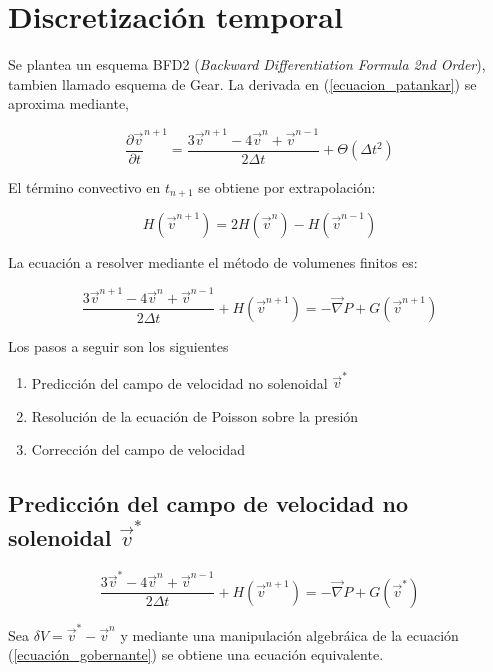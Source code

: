 \section{Discretización temporal}

Se plantea un esquema BFD2 (\textit{Backward Differentiation Formula 2nd Order}), tambien llamado esquema de Gear. La derivada en (\ref{ecuacion_patankar}) se aproxima mediante,

\begin{equation}
\dfrac{\partial \vec{v}}{\partial t} ^ {n+1} = \dfrac{3 \vec{v}^{n+1} -4\vec{v}^n + \vec{v}^{n-1}}{2 \Delta t} + \Theta(\Delta t^2) 
\end{equation}

El término convectivo en $t_{n+1}$ se obtiene por extrapolación:

\begin{equation}
H(\vec{v}^{n+1}) = 2 H(\vec{v}^n) - H(\vec{v}^{n-1})
\end{equation}

La ecuación a resolver mediante el método de volumenes finitos es:

\begin{equation} \label{ecuación_gobernante}
\dfrac{3 \vec{v}^{n+1} -4\vec{v}^n + \vec{v}^{n-1}}{2 \Delta t} + H(\vec{v}^{n+1}) = -\vec{\nabla} P + G(\vec{v}^{n+1})
\end{equation}

Los pasos a seguir son los siguientes
\begin{enumerate}
\item Predicción del campo de velocidad no solenoidal $\vec{v}^*$
\item Resolución de la ecuación de Poisson sobre la presión
\item Corrección del campo de velocidad
\end{enumerate}

\subsection{Predicción del campo de velocidad no solenoidal $\vec{v}^*$}

\begin{equation}
\dfrac{3 \vec{v}^{*} -4\vec{v}^n + \vec{v}^{n-1}}{2 \Delta t} + H(\vec{v}^{n+1}) = -\vec{\nabla} P + G(\vec{v}^{*})
\end{equation}

Sea $\delta V = \vec{v}^* - \vec{v}^n $ y mediante una manipulación algebráica de la ecuación (\ref{ecuación_gobernante}) se obtiene una ecuación equivalente.


